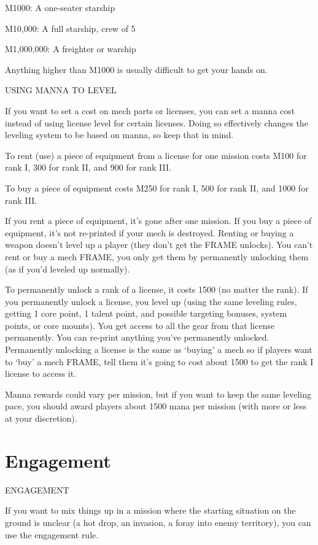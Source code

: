 M1000: A one-seater starship
 
M10,000: A full starship, crew of 5
 
M1,000,000: A freighter or warship
 
Anything higher than M1000 is usually difficult to get your hands on.
 

                                       USING MANNA TO LEVEL  

If you want to set a cost on mech parts or licenses, you can set a manna cost instead of using  
license level for certain licenses. Doing so effectively changes the leveling system to be based on  
manna, so keep that in mind.
 

To rent (use) a piece of equipment from a license for one mission costs M100 for rank I, 300  
for rank II, and 900 for rank III.   

To buy a piece of equipment costs M250 for rank I, 500 for rank II, and 1000 for rank III. 
 

If you rent a piece of equipment, it’s gone after one mission. If you buy a piece of equipment, it’s  
not re-printed if your mech is destroyed. Renting or buying a weapon doesn’t level up a player  
(they don’t get the FRAME unlocks). You can’t rent or buy a mech FRAME, you only get them by  
permanently unlocking them (as if you’d leveled up normally).
 

To permanently unlock a rank of a license, it costs 1500 (no matter the rank). If you  
permanently unlock a license, you level up (using the same leveling rules, getting 1 core point, 1  
talent point, and possible targeting bonuses, system points, or core mounts). You get access to  
all the gear from that license permanently. You can re-print anything you’ve permanently  
unlocked. Permanently unlocking a license is the same as ‘buying’ a mech so if players want to  
‘buy’ a mech FRAME, tell them it’s going to cost about 1500 to get the rank I license to access it.
 

Manna rewards could vary per mission, but if you want to keep the same leveling pace, you  
should award players about 1500 mana per mission (with more or less at your discretion).  

\chapter{Engagement}
                                         ENGAGEMENT
 

If you want to mix things up in a mission where the starting situation on the ground is unclear (a  
hot drop, an invasion, a foray into enemy territory), you can use the engagement rule.
 

